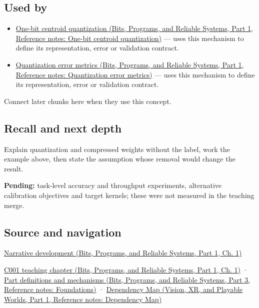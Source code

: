 \subsection{Used by}\label{appendix-fdc7879e8bf2-used-by}

\hypertarget{appendix-fdc7879e8bf2-used-by}{}

\begin{itemize}
\tightlist
\item
  \href{../01-Bits-Programs-and-Reliable-Systems-P01/main.pdf\#nameddest=appendix-4ccd7a775813}{One-bit centroid quantization (Bits, Programs, and Reliable Systems, Part 1, Reference notes: One-bit centroid quantization)} --- uses this mechanism to define its representation, error or validation contract.
\item
  \href{../01-Bits-Programs-and-Reliable-Systems-P01/main.pdf\#nameddest=appendix-537171d69d27}{Quantization error metrics (Bits, Programs, and Reliable Systems, Part 1, Reference notes: Quantization error metrics)} --- uses this mechanism to define its representation, error or validation contract.
\end{itemize}

Connect later chunks here when they use this concept.

\subsection{Recall and next depth}\label{appendix-fdc7879e8bf2-recall-and-next-depth}

\hypertarget{appendix-fdc7879e8bf2-recall-and-next-depth}{}

Explain quantization and compressed weights without the label, work the example above, then state the assumption whose removal would change the result.

\textbf{Pending:} task-level accuracy and throughput experiments, alternative calibration objectives and target kernels; these were not measured in the teaching merge.

\subsection{Source and navigation}\label{appendix-fdc7879e8bf2-source-and-navigation}

\hypertarget{appendix-fdc7879e8bf2-source-and-navigation}{}

\href{../01-Bits-Programs-and-Reliable-Systems-P01/main.pdf\#nameddest=01-foundations-i-ch001-choosing-what-information-to-keep}{Narrative development (Bits, Programs, and Reliable Systems, Part 1, Ch. 1)}

\href{../01-Bits-Programs-and-Reliable-Systems-P01/main.pdf\#nameddest=01-foundations-i-ch001-from-a-signal-to-an-interpretation}{C001 teaching chapter (Bits, Programs, and Reliable Systems, Part 1, Ch. 1)} · \href{../01-Bits-Programs-and-Reliable-Systems-P03/main.pdf\#nameddest=appendix-fd090d982a15}{Part definitions and mechanisms (Bits, Programs, and Reliable Systems, Part 3, Reference notes: Foundations)} · \href{../07-Vision-XR-and-Playable-Worlds-P01/main.pdf\#nameddest=appendix-4ad47bdd269a}{Dependency Map (Vision, XR, and Playable Worlds, Part 1, Reference notes: Dependency Map)}
